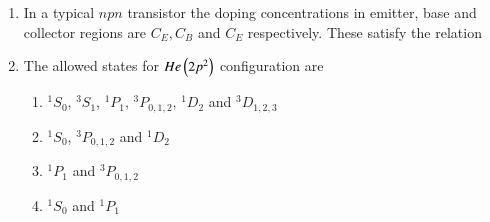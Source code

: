 \documentclass[journal]{IEEEtran}
\begin{document}
\begin{enumerate}
\item In a typical $npn$ transistor the doping concentrations in emitter, base and collector regions are $C_E, C_B$ and $C_E$ respectively. These satisfy the relation 
\begin{enumerate}
\end{enumerate}
\item The allowed states for $He\left(2p^2\right)$ configuration are 
\begin{enumerate}
        \item $^1S_0$, $^3 S_1$, $^1P_1$, $^3P_{0,1,2}$, $^1D_2$ and $ ^3D_{1,2,3}$
        \item  $^1S_0$, $^3P_{0,1,2}$ and $^1D_2$
        \item $^1P_1$ and $^3P_{0,1,2}$
        \item $^1S_0$ and $^1P_1$
\end{enumerate}
\end{enumerate}
\end{document}

